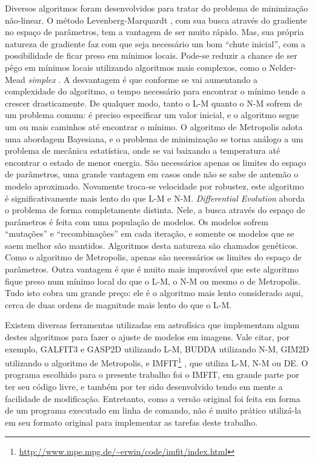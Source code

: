Diversos algoritmos foram desenvolvidos para tratar do problema de minimização
não-linear. O método Levenberg-Marquardt \citep[daqui em diante
L-M]{Levenberg1944, Marquardt1963}, com sua busca através do gradiente no espaço
de parâmetros, tem a vantagem de ser muito rápido. Mas, sua própria natureza de
gradiente faz com que seja necessário um bom ``chute inicial'', com a
possibilidade de ficar preso em mínimos locais. Pode-se reduzir a chance de ser
pêgo em mínimos locais utilizando algoritmos mais complexos, como o Nelder-Mead
{\em simplex} \citep[daqui em diante N-M]{Nelder1965}. A desvantagem é que
conforme se vai aumentando a complexidade do algoritmo, o tempo necessário para
encontrar o mínimo tende a crescer drasticamente. De qualquer modo, tanto o L-M
quanto o N-M sofrem de um problema comum: é preciso especificar um valor
inicial, e o algoritmo segue um ou mais caminhos até encontrar o mínimo. O
algoritmo de Metropolis \citep{Metropolis1953, Saha1994} adota uma abordagem
Bayesiana, e o problema de minimização se torna análogo a um problema de
mecânica estatística, onde se vai baixando a temperatura até encontrar o estado
de menor energia. São necessários apenas os limites do espaço de parâmetros, uma
grande vantagem em casos onde não se sabe de antemão o modelo aproximado.
Novamente troca-se velocidade por robustez, este algoritmo é significativamente
mais lento do que L-M e N-M. {\em Differential Evolution} \citep[daqui em diante
DE]{Storn1997} aborda o problema de forma completamente distinta. Nele, a busca
através do espaço de parâmetros é feita com uma população de modelos. Os modelos
sofrem ``mutações'' e ``recombinações'' em cada iteração, e somente os modelos
que se saem melhor são mantidos. Algoritmos desta natureza são chamados
genéticos. Como o algoritmo de Metropolis, apenas são necessários os limites do
espaço de parâmetros. Outra vantagem é que é muito mais improvável que este
algoritmo fique preso num mínimo local do que o L-M, o N-M ou mesmo o de
Metropolis. Tudo isto cobra um grande preço: ele é o algoritmo mais lento
considerado aqui, cerca de duas ordens de magnitude mais lento do que o L-M.

Existem diversas ferramentas utilizadas em astrofísica que implementam algum
destes algoritmos para fazer o ajuste de modelos em imagens. Vale citar, por
exemplo, GALFIT3 \citep{Peng2010} e GASP2D \citep{MendezAbreu2008} utilizando
L-M, BUDDA \citep{DeSouza2004} utilizando N-M, GIM2D \citep{Simard2002}
utilizando o algoritmo de Metropolis, e
IMFIT\footnote{\url{http://www.mpe.mpg.de/~erwin/code/imfit/index.html}}
\citet{Erwin2015}, que utiliza L-M, N-M ou DE. O programa escolhido para o
presente trabalho foi o IMFIT, em grande parte por ter seu código livre, e
também por ter sido desenvolvido tendo em mente a facilidade de modificação.
Entretanto, como a versão original foi feita em forma de um programa executado
em linha de comando, não é muito prático utilizá-la em seu formato original para
implementar as tarefas deste trabalho.

